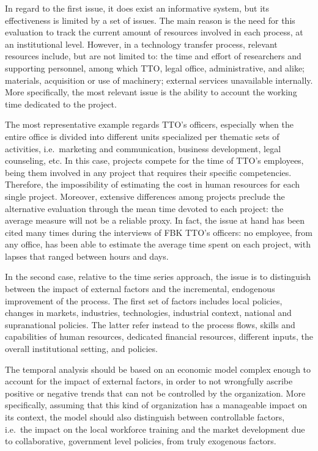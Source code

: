 In regard to the first issue, it does exist an informative system, but its effectiveness is limited by a set of issues. The main reason is the need for this evaluation to track the current amount of resources involved in each process, at an institutional level. However, in a technology transfer process, relevant resources include, but are not limited to: the time and effort of researchers and supporting personnel, among which TTO, legal office, administrative, and alike; materials, acquisition or use of machinery; external services unavailable internally. More specifically, the most relevant issue is the ability to account the working time dedicated to the project. 

The most representative example regards TTO's officers, especially when the entire office is divided into different units specialized per thematic sets of activities, i.e.\ marketing and communication, business development, legal counseling, etc. In this case, projects compete for the time of TTO's employees, being them involved in any project that requires their specific competencies. Therefore, the impossibility of estimating the cost in human resources for each single project. Moreover, extensive differences among projects preclude the alternative evaluation through the mean time devoted to each project: the average measure will not be a reliable proxy. In fact, the issue at hand has been cited many times during the interviews of FBK TTO's officers: no employee, from any office, has been able to estimate the average time spent on each project, with lapses that ranged between hours and days.

In the second case, relative to the time series approach, the issue is to distinguish between the impact of external factors and the incremental, endogenous improvement of the process. The first set of factors includes local policies, changes in markets, industries, technologies, industrial context, national and supranational policies. The latter refer instead to the process flows, skills and capabilities of human resources, dedicated financial resources, different inputs, the overall institutional setting, and policies.

The temporal analysis should be based on an economic model complex enough to account for the impact of external factors, in order to not wrongfully ascribe positive or negative trends that can not be controlled by the organization. More specifically, assuming that this kind of organization has a manageable impact on its context, the model should also distinguish between controllable factors, i.e.\ the impact on the local workforce training and the market development due to collaborative, government level policies, from truly exogenous factors.


